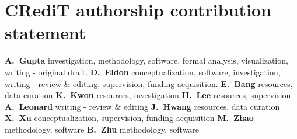 \section*{CRediT authorship contribution statement}

\textbf{A.~Gupta} investigation, methodology, software, formal analysis, visualization, writing - original draft.
\textbf{D.~Eldon} conceptualization, software, investigation, writing - review \& editing, supervision, funding acquisition.
\textbf{E.~Bang} resources, data curation
\textbf{K.~Kwon} resources, investigation
\textbf{H.~Lee} resources, supervision
\textbf{A.~Leonard} writing - review \& editing
\textbf{J.~Hwang} resources, data curation
\textbf{X.~Xu} conceptualization, supervision, funding acquisition
\textbf{M.~Zhao} methodology, software
\textbf{B.~Zhu} methodology, software
